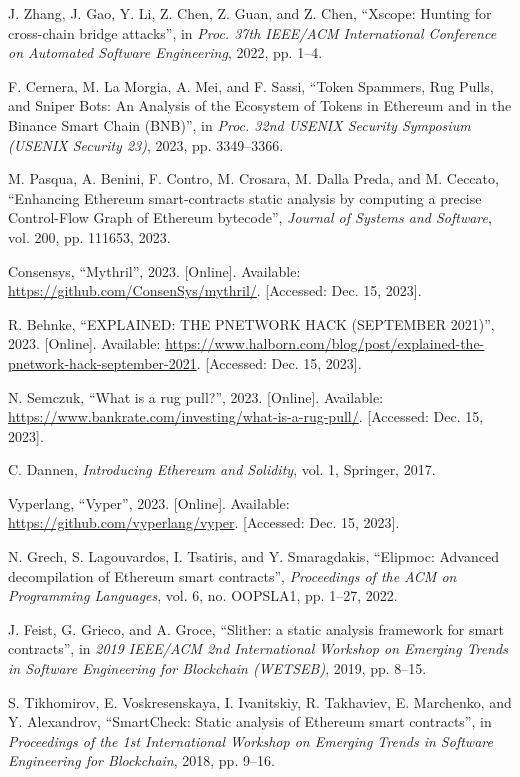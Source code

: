 \begin{thebibliography}{00}
 J. Zhang, J. Gao, Y. Li, Z. Chen, Z. Guan, and Z. Chen, ``Xscope: Hunting for cross-chain bridge attacks'', in \textit{Proc. 37th IEEE/ACM International Conference on Automated Software Engineering}, 2022, pp. 1--4.

 F. Cernera, M. La Morgia, A. Mei, and F. Sassi, ``Token Spammers, Rug Pulls, and Sniper Bots: An Analysis of the Ecosystem of Tokens in Ethereum and in the Binance Smart Chain (BNB)'', in \textit{Proc. 32nd USENIX Security Symposium (USENIX Security 23)}, 2023, pp. 3349--3366.

 M. Pasqua, A. Benini, F. Contro, M. Crosara, M. Dalla Preda, and M. Ceccato, ``Enhancing Ethereum smart-contracts static analysis by computing a precise Control-Flow Graph of Ethereum bytecode'', \textit{Journal of Systems and Software}, vol. 200, pp. 111653, 2023.

 Consensys, ``Mythril'', 2023. [Online]. Available: \url{https://github.com/ConsenSys/mythril/}. [Accessed: Dec. 15, 2023].

 R. Behnke, ``EXPLAINED: THE PNETWORK HACK (SEPTEMBER 2021)'', 2023. [Online]. Available: \url{https://www.halborn.com/blog/post/explained-the-pnetwork-hack-september-2021}. [Accessed: Dec. 15, 2023].

 N. Semczuk, ``What is a rug pull?'', 2023. [Online]. Available: \url{https://www.bankrate.com/investing/what-is-a-rug-pull/}. [Accessed: Dec. 15, 2023].

 C. Dannen, \textit{Introducing Ethereum and Solidity}, vol. 1, Springer, 2017.

 Vyperlang, ``Vyper'', 2023. [Online]. Available: \url{https://github.com/vyperlang/vyper}. [Accessed: Dec. 15, 2023].

 N. Grech, S. Lagouvardos, I. Tsatiris, and Y. Smaragdakis, ``Elipmoc: Advanced decompilation of Ethereum smart contracts'', \textit{Proceedings of the ACM on Programming Languages}, vol. 6, no. OOPSLA1, pp. 1--27, 2022.

 J. Feist, G. Grieco, and A. Groce, ``Slither: a static analysis framework for smart contracts'', in \textit{2019 IEEE/ACM 2nd International Workshop on Emerging Trends in Software Engineering for Blockchain (WETSEB)}, 2019, pp. 8--15.

 S. Tikhomirov, E. Voskresenskaya, I. Ivanitskiy, R. Takhaviev, E. Marchenko, and Y. Alexandrov, ``SmartCheck: Static analysis of Ethereum smart contracts'', in \textit{Proceedings of the 1st International Workshop on Emerging Trends in Software Engineering for Blockchain}, 2018, pp. 9--16.


\end{thebibliography}
